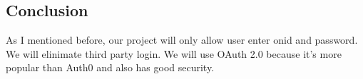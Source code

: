 \documentclass[letterpaper, 10pt,titlepage]{article}
\begin{document}
\subsection{Conclusion}
As I mentioned before, our project will only allow user enter onid and password. We will elinimate third party login. We will use OAuth 2.0 because it's more popular than Auth0 and also has good security.

\vspace{0.5cm}

\newpage



\end{document}
